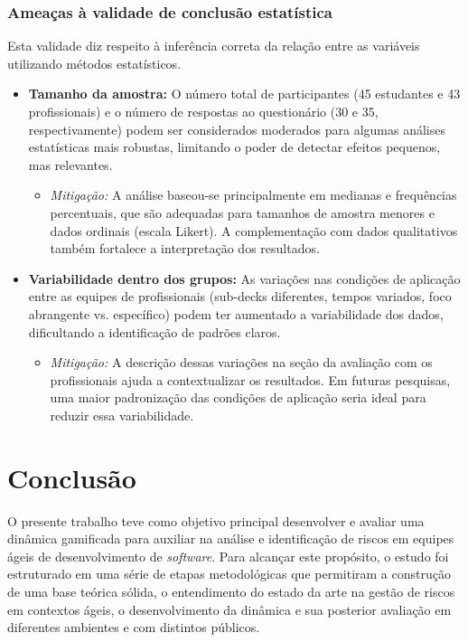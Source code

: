 \documentclass[
	12pt,
	openright,
	twoside,
	a4paper,
	english,
	brazil
	]{abntex2}
\begin{document}
\subsection{Ameaças à validade de conclusão estatística}
\label{sec:ameacas-estatistica}

Esta validade diz respeito à inferência correta da relação entre as variáveis utilizando métodos estatísticos.

\begin{itemize}
  \item \textbf{Tamanho da amostra:} O número total de participantes (45 estudantes e 43 profissionais) e o número de respostas ao questionário (30 e 35, respectivamente) podem ser considerados moderados para algumas análises estatísticas mais robustas, limitando o poder de detectar efeitos pequenos, mas relevantes.
    \begin{itemize}
    \item \textit{Mitigação:} A análise baseou-se principalmente em medianas e frequências percentuais, que são adequadas para tamanhos de amostra menores e dados ordinais (escala Likert). A complementação com dados qualitativos também fortalece a interpretação dos resultados.
    \end{itemize}
  \item \textbf{Variabilidade dentro dos grupos:} As variações nas condições de aplicação entre as equipes de profissionais (sub-decks diferentes, tempos variados, foco abrangente vs. específico) podem ter aumentado a variabilidade dos dados, dificultando a identificação de padrões claros.
    \begin{itemize}
    \item \textit{Mitigação:} A descrição dessas variações na seção da avaliação com os profissionais ajuda a contextualizar os resultados. Em futuras pesquisas, uma maior padronização das condições de aplicação seria ideal para reduzir essa variabilidade.
    \end{itemize}
\end{itemize}


\chapter{Conclusão}
\label{cap:conclusao}

O presente trabalho teve como objetivo principal desenvolver e avaliar uma dinâmica gamificada para auxiliar na análise e identificação de riscos em equipes ágeis de desenvolvimento de \textit{software}. Para alcançar este propósito, o estudo foi estruturado em uma série de etapas metodológicas que permitiram a construção de uma base teórica sólida, o entendimento do estado da arte na gestão de riscos em contextos ágeis, o desenvolvimento da dinâmica e sua posterior avaliação em diferentes ambientes e com distintos públicos.
\end{document}
